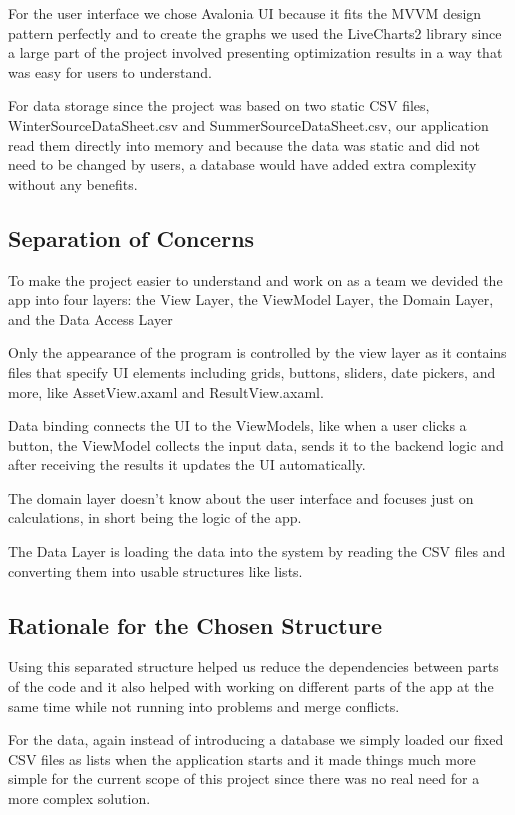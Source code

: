 For the user interface we chose Avalonia UI because it fits the MVVM design pattern perfectly and to create the graphs we used the LiveCharts2 library since a large part of the project involved presenting optimization results in a way that was easy for users to understand.

For data storage since the project was based on two static CSV files, WinterSourceDataSheet.csv and SummerSourceDataSheet.csv, our application read them directly into memory and because the data was static and did not need to be changed by users, a database would have added extra complexity without any benefits.

\subsection{Separation of Concerns}

To make the project easier to understand and work on as a team we devided the app into four layers: the View Layer, the ViewModel Layer, the Domain Layer, and the Data Access Layer

Only the appearance of the program is controlled by the view layer as it contains files that specify UI elements including grids, buttons, sliders, date pickers, and more, like AssetView.axaml and ResultView.axaml.

Data binding connects the UI to the ViewModels, like when a user clicks a button, the ViewModel collects the input data, sends it to the backend logic and after receiving the results it updates the UI automatically.

The domain layer doesn't know about the user interface and focuses just on calculations, in short being the logic of the app.

The Data Layer is loading the data into the system by reading the CSV files and converting them into usable structures like lists.

\subsection{Rationale for the Chosen Structure}

Using this separated structure helped us reduce the dependencies between parts of the code and it also helped with working on different parts of the app at the same time while not running into problems and merge conflicts.

For the data, again instead of introducing a database we simply loaded our fixed CSV files as lists when the application starts and it made things much more simple for the current scope of this project since there was no real need for a more complex solution.
